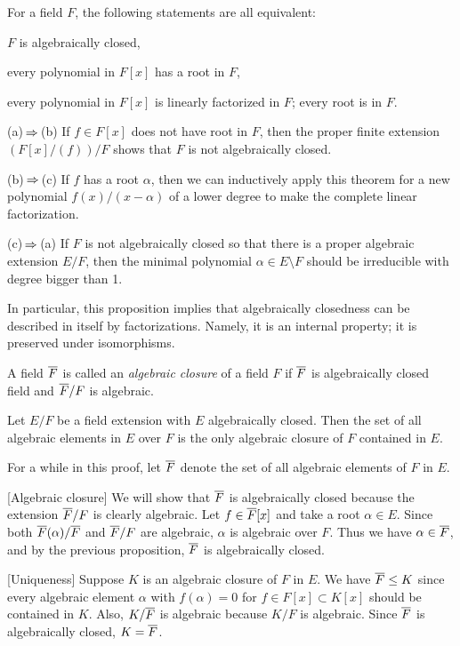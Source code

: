 \documentclass{../note}
\begin{document}
\begin{prop}
For a field $F$, the following statements are all equivalent:
\begin{parts}
\item $F$ is algebraically closed,
\item every polynomial in $F[x]$ has a root in $F$,
\item every polynomial in $F[x]$ is linearly factorized in $F$; every root is in $F$.
\end{parts}
\end{prop}
\begin{pf}
(a)$\impl$(b)
If $f\in F[x]$ does not have root in $F$, then the proper finite extension $(F[x]/(f))/F$ shows that $F$ is not algebraically closed.

(b)$\impl$(c)
If $f$ has a root $\alpha$, then we can inductively apply this theorem for a new polynomial $f(x)/(x-\alpha)$ of a lower degree to make the complete linear factorization.

(c)$\impl$(a)
If $F$ is not algebraically closed so that there is a proper algebraic extension $E/F$, then the minimal polynomial $\alpha\in E\setminus F$ should be irreducible with degree bigger than 1.
\end{pf}
\begin{rmk}
In particular, this proposition implies that algebraically closedness can be described in itself by factorizations.
Namely, it is an internal property; it is preserved under isomorphisms.
\end{rmk}


\begin{defn}
A field $\overline F$ is called an \emph{algebraic closure} of a field $F$ if $\overline F$ is algebraically closed field and $\overline F/F$ is algebraic.
\end{defn}

\begin{prop}
Let $E/F$ be a field extension with $E$ algebraically closed.
Then the set of all algebraic elements in $E$ over $F$ is the only algebraic closure of $F$ contained in $E$.
\end{prop}
\begin{pf}
For a while in this proof, let $\overline F$ denote the set of all algebraic elements of $F$ in $E$.

[Algebraic closure]
We will show that $\overline F$ is algebraically closed because the extension $\overline F/F$ is clearly algebraic.
Let $f\in\overline F[x]$ and take a root $\alpha\in E$.
Since both $\overline F(\alpha)/\overline F$ and $\overline F/F$ are algebraic, $\alpha$ is algebraic over $F$.
Thus we have $\alpha\in\overline F$, and by the previous proposition, $\overline F$ is algebraically closed.

[Uniqueness]
Suppose $K$ is an algebraic closure of $F$ in $E$.
We have $\overline F\le K$ since every algebraic element $\alpha$ with $f(\alpha)=0$ for $f\in F[x]\subset K[x]$ should be contained in $K$.
Also, $K/\overline F$ is algebraic because $K/F$ is algebraic.
Since $\overline F$ is algebraically closed, $K=\overline F$.
\end{pf}
\end{document}
